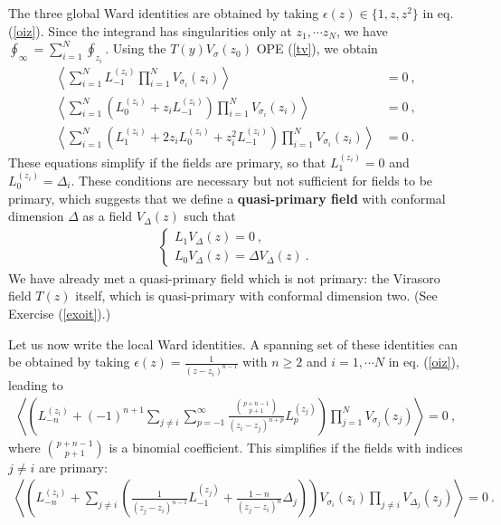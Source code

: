 \documentclass[12pt,a4paper,notitlepage]{report}
\newcommand \la {\left\langle}
\newcommand \ra {\right\rangle}
\newcommand \bla {\left\{\begin{array}{l} }
\newcommand \ela {\end{array}\right. }
\numberwithin{equation}{section}
\theoremstyle{break}
\begin{document}
The three global Ward identities are obtained by taking $\epsilon(z)\in \{1,z,z^2\}$ in eq. (\ref{oiz}). Since the integrand has singularities only at $z_1,\cdots z_N$, we have $\oint_\infty=\sum_{i=1}^N \oint_{z_i}$. Using the 
$T(y)V_\sigma(z_0)$ OPE (\ref{tv}), we obtain 
\begin{align}
\la \sum_{i=1}^N L_{-1}^{(z_i)} \prod_{i=1}^N V_{\sigma_i}(z_i) \ra &= 0 \ ,
\label{slz}
\\
\la \sum_{i=1}^N \left( L_0^{(z_i)} + z_i L_{-1}^{(z_i)}\right) \prod_{i=1}^N V_{\sigma_i}(z_i) \ra & = 0 \ ,
\label{sllz}
\\
\la \sum_{i=1}^N \left( L_1^{(z_i)} + 2z_i L_0^{(z_i)} + z_i^2 L_{-1}^{(z_i)}\right) \prod_{i=1}^N V_{\sigma_i}(z_i) \ra & = 0\ .
\label{slllz}
\end{align}
These equations simplify if the fields are primary, so that $L_1^{(z_i)}=0$ and $L_0^{(z_i)}=\Delta_i$. 
These conditions are necessary but not sufficient for fields to be primary, which suggests that we define a
\textbf{\boldmath quasi-primary field} with conformal dimension $\Delta$ as a field $V_\Delta(z)$ such that 
\begin{align}
 \bla L_1 V_\Delta(z) = 0 \ , 
\\
L_0 V_\Delta(z) = \Delta V_\Delta(z) \ .
\ela
\label{lolz}
\end{align}
We have already met a quasi-primary field which is not primary: the Virasoro field $T(z)$ itself, which is quasi-primary with conformal dimension two. (See Exercise (\ref{exoit}).) 

Let us now write the local Ward identities. A spanning set of these identities can be obtained by taking $\epsilon(z) = \frac{1}{(z-z_i)^{n-1}}$ with $n\geq 2$ and $i=1, \cdots N$ in eq. (\ref{oiz}), leading to
\begin{align}
 \la \left( L_{-n}^{(z_i)} + (-1)^{n+1}\sum_{j\neq i}\sum_{p=-1}^\infty \frac{\binom{p+n-1}{p+1}}{(z_i-z_j)^{n+p}} L_p^{(z_j)}\right)  \prod_{j=1}^N V_{\sigma_j}(z_j) \ra = 0\ ,
\label{lwi}
\end{align}
where $\binom{p+n-1}{p+1}$ is a binomial coefficient. This simplifies if the fields with indices $j\neq i$ are primary:
\begin{align}
 \la \left( L_{-n}^{(z_i)} + \sum_{j\neq i} \left(\frac{1}{(z_j-z_i)^{n-1}} L_{-1}^{(z_j)}  + \frac{1-n}{(z_j-z_i)^n} \Delta_j\right)\right) V_{\sigma_i}(z_i)\prod_{j\neq i} V_{\Delta_j}(z_j) \ra =0\ .
\label{lwp}
\end{align}
\end{document}
